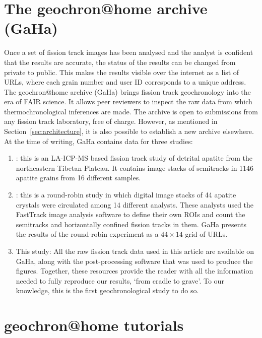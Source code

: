 \documentclass[gchron, manuscript]{copernicus}
\begin{document}
\section{The geochron@home archive (GaHa)}\label{sec:GaHa}

Once a set of fission track images has been analysed and the analyst
is confident that the results are accurate, the status of the results
can be changed from private to public. This makes the results visible
over the internet as a list of URLs, where each grain number and user
ID corresponds to a unique address. The geochron@home archive
(GaHa) brings fission track geochronology into the era of FAIR
science. It allows peer reviewers to inspect the raw data from which
thermochronological inferences are made. The archive is open to
submissions from any fission track laboratory, free of charge.
However, as mentioned in Section~\ref{sec:architecture}, it is also
possible to establish a new archive elsewhere. At the time of writing,
GaHa contains data for three studies:

\begin{enumerate}
\item{\citet{guo2025}}: this is an LA-ICP-MS based fission track study
  of detrital apatite from the northeastern Tibetan Plateau. It
  contains image stacks of semitracks in 1146 apatite grains from 16
  different samples.
\item{\citet{tamer2025}}: this is a round-robin study in which digital
  image stacks of 44 apatite crystals were circulated among 14
  different analysts. These analysts used the FastTrack image analysis
  software \citep[which is part of the Fission Track Studio
    suite;][]{gleadow2009} to define their own ROIs and count the
  semitracks and horizontally confined fission tracks in them. GaHa
  presents the results of the round-robin experiment as a
  ${44}\times{14}$ grid of URLs.
\item{This study}: All the raw fission track data used in this article
  are available on GaHa, along with the post-processing software that
  was used to produce the figures. Together, these resources provide
  the reader with all the information needed to fully reproduce our
  results, `from cradle to grave'. To our knowledge, this is the first
  geochronological study to do so.
\end{enumerate}

\section{geochron@home tutorials}\label{sec:tutorial}
\end{document}
